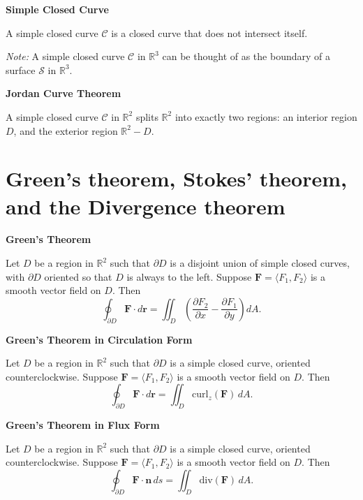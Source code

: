 \documentclass{article}
\newcommand{\R}{\mathbb{R}}
\newenvironment{definition}[1]{
    \par\noindent\textbf{#1}\par\noindent
}{
    \par \vspace{0.5cm}
}
\begin{document}
\begin{definition}{Simple Closed Curve}
A simple closed curve \(\mathcal{C}\) is a closed curve that does not intersect itself.

\textit{Note: }A simple closed curve \(\mathcal{C}\) in \(\R^3\) can be thought of as the boundary of a surface \(\mathcal{S}\) in \(\R^3\).
\end{definition}


\begin{definition}{Jordan Curve Theorem}
A simple closed curve \(\mathcal{C}\) in \(\R^2\) splits \(\R^2\) into exactly two regions: an interior region \(D\), and the exterior region \(\R^2 - D\).
\end{definition}






\section{Green's theorem, Stokes' theorem, and the Divergence theorem}


\begin{definition}{Green's Theorem}
Let \(D\) be a region in \(\R^2\) such that \(\partial D\) is a disjoint union of simple closed curves, with \(\partial D\) oriented so that \(D\) is always to the left. Suppose \(\bm{F} = \langle F_1, F_2 \rangle\) is a smooth vector field on \(D\). Then
\[ \oint_{\partial D} \bm{F} \cdot d\bm{r} = \iint_{D} \left( \frac{\partial F_2}{\partial x} - \frac{\partial F_1}{\partial y} \right) dA. \]
\end{definition}

\begin{definition}{Green's Theorem in Circulation Form}
Let \(D\) be a region in \(\R^2\) such that \(\partial D\) is a simple closed curve, oriented counterclockwise. Suppose \(\bm{F} = \langle F_1, F_2 \rangle\) is a smooth vector field on \(D\). Then
\[ \oint_{\partial D} \bm{F} \cdot d\bm{r} = \iint_{D} \text{curl}_z (\bm{F}) \, dA. \]
\end{definition}

\begin{definition}{Green's Theorem in Flux Form}
Let \(D\) be a region in \(\R^2\) such that \(\partial D\) is a simple closed curve, oriented counterclockwise. Suppose \(\bm{F} = \langle F_1, F_2 \rangle\) is a smooth vector field on \(D\). Then
\[ \oint_{\partial D} \bm{F} \cdot \bm{n} \, ds = \iint_{D} \text{div}(\bm{F}) \, dA. \]
\end{definition}
\end{document}
